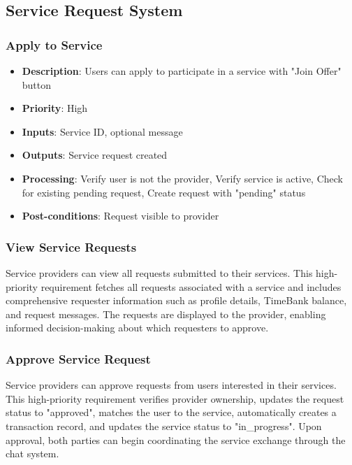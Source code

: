 \documentclass[12pt,a4paper]{report}
\begin{document}
\subsection{Service Request System}

\subsubsection{Apply to Service}
\begin{itemize}
    \item \textbf{Description}: Users can apply to participate in a service with "Join Offer" button
    \item \textbf{Priority}: High
    \item \textbf{Inputs}: Service ID, optional message
    \item \textbf{Outputs}: Service request created
    \item \textbf{Processing}: Verify user is not the provider, Verify service is active, Check for existing pending request, Create request with "pending" status
    \item \textbf{Post-conditions}: Request visible to provider
\end{itemize}

\subsubsection{View Service Requests}

Service providers can view all requests submitted to their services. This high-priority requirement fetches all requests associated with a service and includes comprehensive requester information such as profile details, TimeBank balance, and request messages. The requests are displayed to the provider, enabling informed decision-making about which requesters to approve.

\subsubsection{Approve Service Request}

Service providers can approve requests from users interested in their services. This high-priority requirement verifies provider ownership, updates the request status to "approved", matches the user to the service, automatically creates a transaction record, and updates the service status to "in\_progress". Upon approval, both parties can begin coordinating the service exchange through the chat system.
\end{document}
